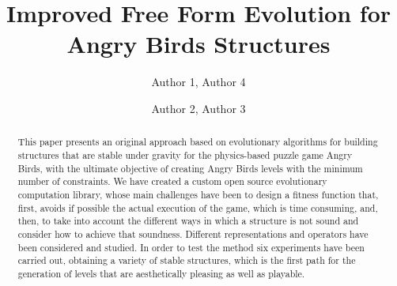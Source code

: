 \documentclass[sigconf]{acmart}
\begin{document}
\title{Improved Free Form Evolution for Angry Birds Structures}

\author{Author 1, Author 4}

\author{Author 2, Author 3}

\renewcommand{\shortauthors}{Author 1 et al.}


\begin{abstract}
This paper presents an original approach based on evolutionary algorithms for 
building structures that
are stable under gravity for the physics-based puzzle game Angry
Birds, with the ultimate objective of creating
Angry Birds levels with the minimum number of constraints.
We have created a custom open source evolutionary computation library,
whose main challenges have been to design a fitness function that, first, 
avoids if
possible the actual execution of the game, which is time
consuming, and, then, to take into account the different ways in which
a structure is not sound and consider how to achieve that soundness. Different 
representations and operators have been considered and studied. In
order to test the method six experiments have been carried out,
obtaining a variety of stable structures, which is the first path for
the generation of levels that are aesthetically pleasing as well as
playable. 
\end{abstract}

%
%
\end{document}
